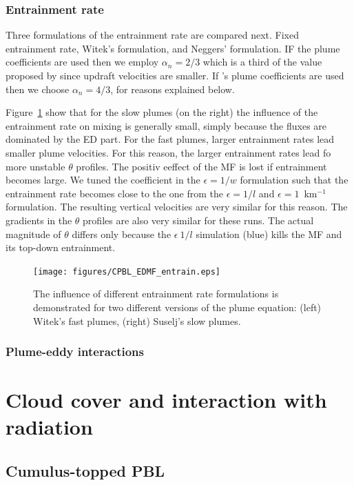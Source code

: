 \documentclass[dvipdfmx,a4paper,10pt]{article}
\begin{document}
\subsubsection{Entrainment rate}

Three formulations of the entrainment rate are compared next. Fixed entrainment rate, Witek's formulation, and Neggers' formulation. IF the \cite{suselj13} plume coefficients are used then we employ $\alpha_n=2/3$ which is a third of the value proposed by \cite{witek11} since updraft velocities are smaller. If \cite{witek11}'s plume coefficients are used then we choose $\alpha_n=4/3$, for reasons explained below.

Figure~\ref{fig:entrain} show that for the slow plumes (on the right) the influence of the entrainment rate on mixing is generally small, simply because the fluxes are dominated by the ED part. For the fast plumes, larger entrainment rates lead smaller plume velocities. For this reason, the larger entrainment rates lead fo more unstable $\theta$ profiles. The positiv eeffect of the MF is lost if entrainment becomes large. We tuned the coefficient in the $\epsilon=1/w$ formulation such that the entrainment rate becomes close to the one from the $\epsilon=1/l$ and $\epsilon=1$~km$^{-1}$ formulation. The resulting vertical velocities are very similar for this reason. The gradients in the $\theta$ profiles are also very similar for these runs. The actual magnitude of $\theta$ differs only because the $\epsilon~1/l$ simulation (blue) kills the MF and its top-down entrainment.   

\begin{figure}[bthp]
\centering
 \texttt{[image: figures/CPBL\_EDMF\_entrain.eps]}
\caption{The influence of different entrainment rate formulations is demonstrated for two different versions of the plume equation: (left) Witek's fast plumes, (right) Suselj's slow plumes. } \label{fig:entrain}
\end{figure}

\subsubsection{Plume-eddy interactions}

\section{Cloud cover and interaction with radiation}\label{sec:clouds}

\subsection{Cumulus-topped PBL}
\end{document}

